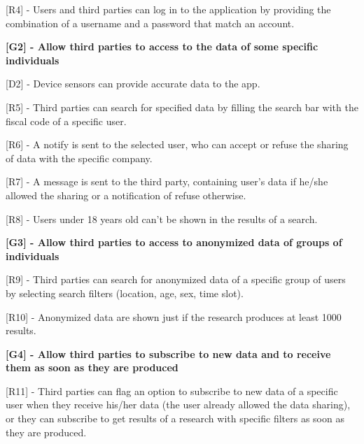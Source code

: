 [R4] - Users and third parties can log in to the application by providing the combination of a username and a password that match an account. \newline

\hspace{-\parindent}\textbf{[G2] - Allow third parties to access to the data of some specific individuals} \newline

[D2] - Device sensors can provide accurate data to the app. \newline

[R5] - Third parties can search for specified data by filling the search bar with the fiscal code of a specific user. \newline

[R6] - A notify is sent to the selected user, who can accept or refuse the sharing of data with the specific company. \newline

[R7] - A message is sent to the third party, containing user's data if he/she allowed the sharing or a notification of refuse otherwise. \newline

[R8] - Users under 18 years old can't be shown in the results of a search. \newline

\hspace{-\parindent}\textbf{[G3] - Allow third parties to access to anonymized data of groups of individuals} \newline

[R9] - Third parties can search for anonymized data of a specific group of users by selecting search filters (location, age, sex, time slot). \newline

[R10] - Anonymized data are shown just if the research produces at least 1000 results. \newline

\hspace{-\parindent}\textbf{[G4] - Allow third parties to subscribe to new data and to receive them as soon as they are produced} \newline

[R11] - Third parties can flag an option to subscribe to new data of a specific user when they receive his/her data (the user already allowed the data sharing), or they can subscribe to get results of a research with specific filters as soon as they are produced. \newline

